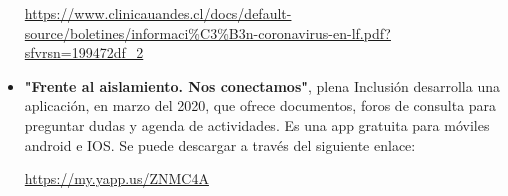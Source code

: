 \begin{itemize}
\href{https://www.clinicauandes.cl/docs/default-source/boletines/informaci\%C3\%B3n-coronavirus-en-lf.pdf?sfvrsn=199472df\_2}{https://www.clinicauandes.cl/docs/default-source/boletines/informaci\%C3\%B3n-coronavirus-en-lf.pdf?sfvrsn=199472df\_2}

\item
{\textbf{"Frente al aislamiento. Nos conectamos"}}, plena Inclusión desarrolla una aplicación, en marzo del 2020, que ofrece documentos, foros de consulta para preguntar dudas y agenda de actividades. Es una app gratuita para móviles android e IOS. 
Se puede descargar a través del siguiente enlace:

\href{https://my.yapp.us/ZNMC4A}{https://my.yapp.us/ZNMC4A}


\end{itemize}








